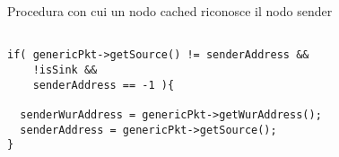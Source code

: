 \begin{listing}[h]
    \caption{Procedura con cui un nodo cached riconosce il nodo sender}
    \label{code:setForACK}
    \begin{verbatim}

if( genericPkt->getSource() != senderAddress && 
    !isSink && 
    senderAddress == -1 ){

  senderWurAddress = genericPkt->getWurAddress();
  senderAddress = genericPkt->getSource();
}

    \end{verbatim}
\end{listing}